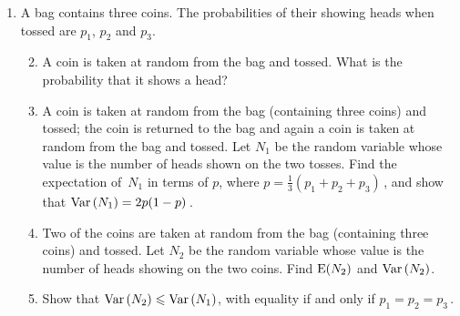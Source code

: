 \documentclass[a4, 11pt]{report}
\newlength{\qspace}
\newcounter{qnumber}
\newenvironment{question}%
 {\vspace{\qspace}
  \begin{enumerate}[\bfseries 1\quad][10]%
    \setcounter{enumi}{\value{qnumber}}%
    \item%
 }
{
  \end{enumerate}
  \filbreak
  \stepcounter{qnumber}
 }
\newenvironment{questionparts}[1][1]%
 {
  \begin{enumerate}[\bfseries (i)]%
    \setcounter{enumii}{#1}
    \addtocounter{enumii}{-1}
    \setlength{\itemsep}{5mm}
    \setlength{\parskip}{8pt}
 }
 {
  \end{enumerate}
 }
\def\E{{\rm E}}
\def\le{\leqslant}
\def\var{{\rm Var}\,}
\begin{document}
\begin{question} A bag contains 
three coins. 
The probabilities of their showing  heads when 
tossed are $p_1$, $p_2$ and $p_3$. 

\begin{questionparts}

\item
A coin is taken at random from the bag and tossed. 
What is the probability that
it shows a  head?
 

\item A coin is taken at random from the bag (containing three coins)
and tossed; 
the coin is returned to the bag and  again a coin is taken at
random from the bag and tossed.
 Let $N_1$ be the random 
variable whose value is the number of heads shown 
on the two tosses. Find the expectation  
of~$N_1$ in terms of $p$, where $p = \frac{1}{3}(p_1+p_2+p_3)\,$,
and show that  $\var(N_1) =2p(1-p)\,$. 

  
\item Two of the coins are taken at random from the 
bag (containing three coins) and tossed. Let $N_2$ be the random variable 
whose value is the number of heads showing on the two coins. 
Find $\E(N_2)$ and $\var(N_2)$.  

\item
Show  that $\var(N_2)\le  \var(N_1)$,  with equality if and only if
 $p_1=p_2=p_3\,$.
 
\end{questionparts}
\end{question}
\end{document}
